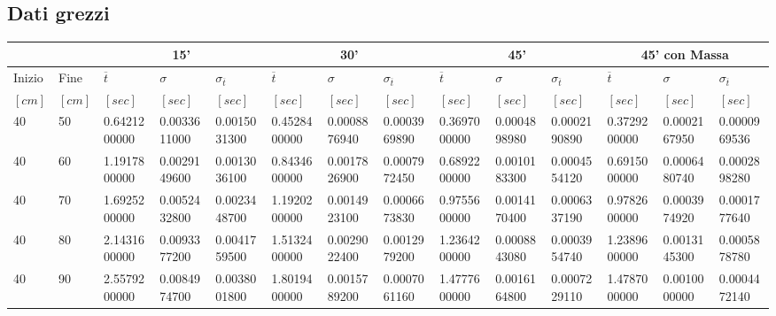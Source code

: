 \documentclass[a4paper,11pt,oneside]{article}
\begin{document}
\subsection{Dati grezzi}
\begin{table}[]
\begin{tabular}{ll|lll|lll|lll|lll}
\toprule
\multicolumn{2}{l|}{}      & \multicolumn{3}{c|}{\textbf{15'}}                      & \multicolumn{3}{c|}{\textbf{30'}}                      & \multicolumn{3}{c}{\textbf{45'}}                       & \multicolumn{3}{c|}{\textbf{45' con Massa}}            \\ \midrule
Inizio      & Fine        & $\overline{t}$ & $\sigma$     & $\sigma_{\overline{t}}$ & $\overline{t}$ & $\sigma$     & $\sigma_{\overline{t}}$ & $\overline{t}$ & $\sigma$     & $\sigma_{\overline{t}}$ & $\overline{t}$ & $\sigma$     & $\sigma_{\overline{t}}$ \\
$[\si{cm}]$ & $[\si{cm}]$ & $[\si{sec}]$   & $[\si{sec}]$ & $[\si{sec}]$           & $[\si{sec}]$   & $[\si{sec}]$ & $[\si{sec}]$           & $[\si{sec}]$   & $[\si{sec}]$ & $[\si{sec}]$           & $[\si{sec}]$   & $[\si{sec}]$ & $[\si{sec}]$           \\ \midrule
40          & 50          & 0.6421200000   & 0.0033611000 & 0.0015031300           & 0.4528400000   & 0.0008876940 & 0.0003969890           & 0.3697000000   & 0.0004898980 & 0.0002190890           & 0.3729200000   & 0.0002167950 & 0.0000969536           \\
40          & 60          & 1.1917800000   & 0.0029149600 & 0.0013036100           & 0.8434600000   & 0.0017826900 & 0.0007972450           & 0.6892200000   & 0.0010183300 & 0.0004554120           & 0.6915000000   & 0.0006480740 & 0.0002898280           \\
40          & 70          & 1.6925200000   & 0.0052432800 & 0.0023448700           & 1.1920200000   & 0.0014923100 & 0.0006673830           & 0.9755600000   & 0.0014170400 & 0.0006337190           & 0.9782600000   & 0.0003974920 & 0.0001777640           \\
40          & 80          & 2.1431600000   & 0.0093377200 & 0.0041759500           & 1.5132400000   & 0.0029022400 & 0.0012979200           & 1.2364200000   & 0.0008843080 & 0.0003954740           & 1.2389600000   & 0.0013145300 & 0.0005878780           \\
40          & 90          & 2.5579200000   & 0.0084974700 & 0.0038001800           & 1.8019400000   & 0.0015789200 & 0.0007061160           & 1.4777600000   & 0.0016164800 & 0.0007229110           & 1.4787000000   & 0.0010000000 & 0.0004472140           \\

\end{tabular}
\end{table}
\end{document}
